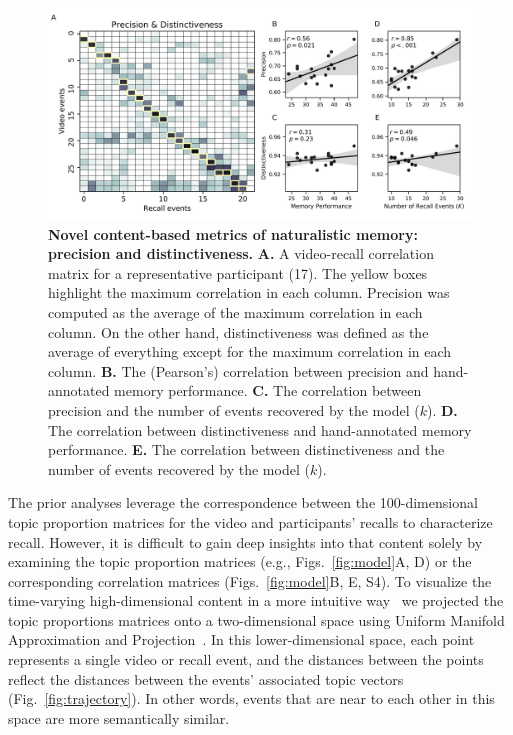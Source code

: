 \documentclass{article}
\newcommand{\corrmats}{S4}
\begin{document}
\begin{figure}[tp]
  \centering
  \includegraphics[width=1\textwidth]{figs/precision_distinctiveness}
  \caption{\small \textbf{Novel content-based metrics of naturalistic memory: precision and distinctiveness.} \textbf{A.} A video-recall correlation matrix for a representative participant (17).  The yellow boxes highlight the maximum correlation in each column.  Precision was computed as the average of the maximum correlation in each column.  On the other hand, distinctiveness was defined as the average of everything except for the maximum correlation in each column. \textbf{B.} The (Pearson's) correlation between precision and hand-annotated memory performance. \textbf{C.} The correlation between precision and the number of events recovered by the model ($k$). \textbf{D.} The correlation between distinctiveness and hand-annotated memory performance. \textbf{E.} The correlation between distinctiveness and the number of events recovered by the model ($k$).}
  \label{fig:precision-distinctiveness}
\end{figure}


The prior analyses leverage the correspondence between the 100-dimensional topic proportion matrices for the video and participants' recalls to characterize recall.  However, it is difficult to gain deep insights into that content solely by examining the topic proportion matrices (e.g., Figs.~\ref{fig:model}A, D) or the corresponding correlation matrices (Figs.~\ref{fig:model}B, E, \corrmats).  To visualize the time-varying high-dimensional content in a more intuitive way~\citep{HeusEtal18a} we projected the topic proportions matrices onto a two-dimensional space using Uniform Manifold Approximation and Projection~\citep[UMAP; ][]{McInHeal18}.  In this lower-dimensional space, each point represents a single video or recall event, and the distances between the points reflect the distances between the events' associated topic vectors (Fig.~\ref{fig:trajectory}). In other words, events that are near to each other in this space are more semantically similar.
\end{document}
